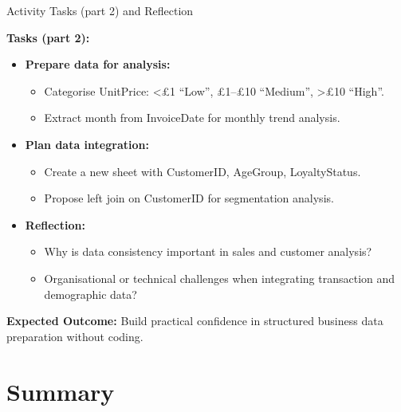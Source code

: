 \documentclass[aspectratio=169, table]{beamer}
\begin{document}
\begin{frame}{Activity Tasks (part 2) and Reflection}
	\vspace{20pt}
	
	\textbf{Tasks (part 2):}
	\begin{itemize}
		\item \textbf{Prepare data for analysis:}
		\begin{itemize}
			\item Categorise UnitPrice: <£1 “Low”, £1–£10 “Medium”, >£10 “High”.
			\item Extract month from InvoiceDate for monthly trend analysis.
		\end{itemize}
		
		\item \textbf{Plan data integration:}
		\begin{itemize}
			\item Create a new sheet with CustomerID, AgeGroup, LoyaltyStatus.
			\item Propose left join on CustomerID for segmentation analysis.
		\end{itemize}
		
		\item \textbf{Reflection:}
		\begin{itemize}
			\item Why is data consistency important in sales and customer analysis?
			\item Organisational or technical challenges when integrating transaction and demographic data?
		\end{itemize}
	\end{itemize}
	
	\textbf{Expected Outcome:} Build practical confidence in structured business data preparation without coding.
	
\end{frame}

\section{Summary}
\end{document}
